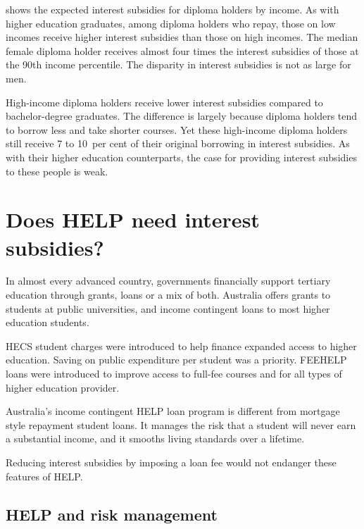 \documentclass[embargoed]{grattan}
\begin{document}
 shows the expected interest subsidies for diploma holders by income.
As with higher education graduates, among diploma holders who repay, those on low incomes receive higher interest subsidies than those on high incomes.
The median female diploma holder receives almost four times the interest subsidies of those at the 90{th} income percentile.
The disparity in interest subsidies is not as large for men.

High-income diploma holders receive lower interest subsidies compared to bachelor-degree graduates.
The difference is largely because diploma holders tend to borrow less and take shorter courses.
Yet these high-income diploma holders still receive 7 to 10~per cent of their original borrowing in interest subsidies.
As with their higher education counterparts, the case for providing interest subsidies to these people is weak.

\chapter[Does HELP need interest subsidies?]{Does \gls{HELP} need interest subsidies?}\label{chap:4-does-help-need-interest-subsidies}

In almost every advanced country, governments financially support tertiary education through grants, loans or a mix of both.
Australia offers grants to students at public universities, and income contingent loans to most higher education students.

\gls{HECS} student charges were introduced to help finance expanded access to higher education.
Saving on public expenditure per student was a priority.
\gls{FEEHELP} loans were introduced to improve access to full-fee courses and for all types of higher education provider.

Australia's income contingent \gls{HELP} loan program is different from mortgage style repayment student loans. It manages the risk that a student will never earn a substantial income, and it smooths living standards over a lifetime.

Reducing interest subsidies by imposing a loan fee would not endanger these features of \gls{HELP}\@.

\section[HELP and risk management]{\gls{HELP} and risk management}\label{help-and-risk-management}
\end{document}
